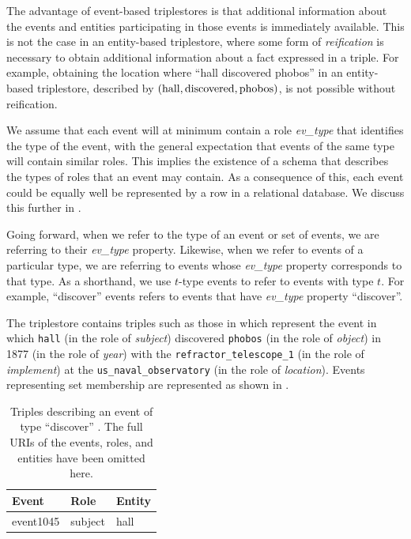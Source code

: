 \documentclass[../main.tex]{subfiles}
\begin{document}
\begin{refsection}
The advantage of event-based triplestores is that additional information about the events and entities participating in those events is immediately available. This is not the case in an entity-based triplestore, where some form of \textit{reification} is necessary to obtain additional information about a fact expressed in a triple.  For example, obtaining the location where ``hall discovered phobos'' in an entity-based triplestore, described by $(\operatorname{hall}, \operatorname{discovered}, \operatorname{phobos})$, is not possible without reification.

We assume that each event will at minimum contain a role \textit{ev\_type} that identifies the type of the event, with the general expectation that events of the same type will contain similar roles.
This implies the existence of a schema that describes the types of roles that an event may contain.  As a consequence of this, each event could be equally well be represented by a row in a relational database.  We discuss this further in .

Going forward, when we refer to the type of an event or set of events, we are referring to their \textit{ev\_type} property.  Likewise, when we refer to events of a particular type, we are referring to events whose \textit{ev\_type} property corresponds to that type.  As a shorthand, we use $t$-type events to refer to events with type $t$.  For example, ``discover'' events refers to events that have \textit{ev\_type} property ``discover''.

The triplestore contains triples such as those in  which represent the event in which \texttt{hall} (in the role of \textit{subject}) discovered \texttt{phobos} (in the role of \textit{object}) in 1877 (in the role of \textit{year}) with the \texttt{refractor\_telescope\_1} (in the role of \textit{implement})  at the \texttt{us\_naval\_observatory} (in the role of \textit{location}).  Events representing set membership are represented as shown in .

\begin{table}
	\caption{Triples describing an event of type ``discover'' \cite{frostpeelar2019}. The full URIs of the events, roles, and entities have been omitted here.}
	\label{webist2019journal:evdiscover}
	\centering
	\begin{tabular}{|l|l|l|}
		\hline
		Event & Role & Entity \\
		\hline
		event1045 &
		subject &
		hall \\


\end{tabular}
\end{table}
\end{refsection}
\end{document}
